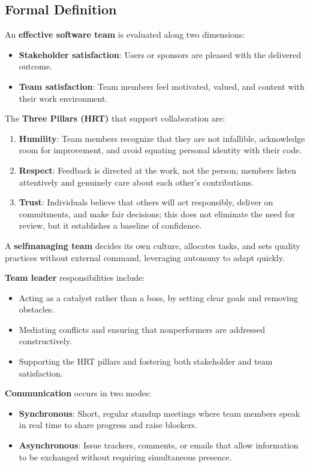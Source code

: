 \documentclass[12pt, a4paper]{article}
\begin{document}
\subsection{Formal Definition}
An \textbf{effective software team} is evaluated along two dimensions:  

\begin{itemize}
 \item \textbf{Stakeholder satisfaction}: Users or sponsors are pleased with the delivered outcome.  
 \item \textbf{Team satisfaction}: Team members feel motivated, valued, and content with their work environment.  
\end{itemize}

The \textbf{Three Pillars (HRT)} that support collaboration are:

\begin{enumerate}
 \item \textbf{Humility}: Team members recognize that they are not infallible, acknowledge room for improvement, and avoid equating personal identity with their code.  
 \item \textbf{Respect}: Feedback is directed at the work, not the person; members listen attentively and genuinely care about each other's contributions.  
 \item \textbf{Trust}: Individuals believe that others will act responsibly, deliver on commitments, and make fair decisions; this does not eliminate the need for review, but it establishes a baseline of confidence.  
\end{enumerate}

A \textbf{selfmanaging team} decides its own culture, allocates tasks, and sets quality practices without external command, leveraging autonomy to adapt quickly.

\textbf{Team leader} responsibilities include:

\begin{itemize}
 \item Acting as a catalyst rather than a boss, by setting clear goals and removing obstacles.
 \item Mediating conflicts and ensuring that nonperformers are addressed constructively.
 \item Supporting the HRT pillars and fostering both stakeholder and team satisfaction.
\end{itemize}

\textbf{Communication} occurs in two modes:

\begin{itemize}
 \item \textbf{Synchronous}: Short, regular standup meetings where team members speak in real time to share progress and raise blockers.
 \item \textbf{Asynchronous}: Issue trackers, comments, or emails that allow information to be exchanged without requiring simultaneous presence.
\end{itemize}
\end{document}
